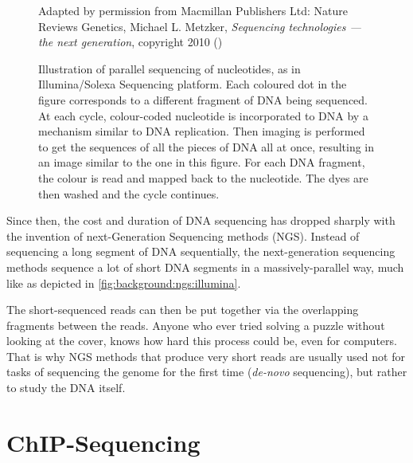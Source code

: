 \documentclass[parskip]{cs4rep}
\begin{document}
    
\begin{figure}
    \centering
    {Adapted by permission from Macmillan Publishers Ltd: Nature Reviews Genetics,
     Michael L. Metzker, \emph{Sequencing technologies — the next generation}, copyright 2010 (\cite{Metzker:j6NWuwFp})}
    \caption{Illustration of parallel sequencing of nucleotides, as in Illumina/Solexa Sequencing platform.
    Each coloured dot in the figure corresponds to a different fragment of DNA being sequenced. 
    At each cycle, colour-coded nucleotide is incorporated to DNA by a mechanism similar to DNA replication. Then imaging is performed to get the sequences of all the pieces of DNA all at once, resulting in an image similar to the one in this figure. For each DNA fragment, the colour is read and mapped back to the nucleotide. The dyes are then washed and the cycle continues\cite{Metzker:j6NWuwFp}.}
    \label{fig:background:ngs:illumina}
\end{figure}

Since then, the cost and duration of DNA sequencing has dropped sharply with the invention of
next-Generation Sequencing methods (NGS). Instead of sequencing a long segment of DNA sequentially,
the next-generation sequencing methods sequence a lot of short DNA segments in a massively-parallel way, much like as depicted in \autoref{fig:background:ngs:illumina}.

The short-sequenced reads can then be put together via the overlapping fragments between the reads. Anyone who ever tried solving a puzzle without looking at the cover, knows how hard this process could be, even for computers. That is why NGS methods that produce very short reads are usually used not for tasks of sequencing the genome for the first time (\emph{de-novo} sequencing), but
rather to study the DNA itself.

\section{ChIP-Sequencing}
\label{sec:chip}
\end{document}
